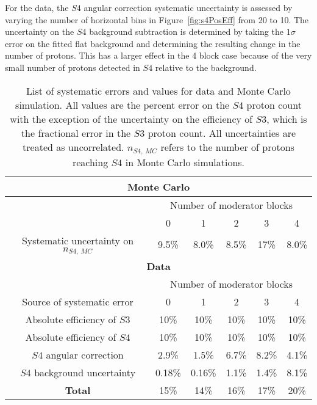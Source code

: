 For the data, the $\mathit{S4}$ angular correction systematic uncertainty is assessed by varying the number of horizontal bins in Figure~\ref{fig:s4PosEff} from 20 to 10.
The uncertainty on the $\mathit{S4}$ background subtraction is determined by taking the $1\sigma$ error on the fitted flat background and determining the resulting change in the number of protons.
This has a larger effect in the 4 block case because of the very small number of protons detected in $\mathit{S4}$ relative to the background.

\begin{table}
	\centering
	\caption{List of systematic errors and values for data and Monte Carlo simulation. All values are the percent error on the $\mathit{S4}$ proton count with the exception of the uncertainty on the efficiency of $\mathit{S3}$, which is the fractional error in the $\mathit{S3}$ proton count. All uncertainties are treated as uncorrelated. $n_{\mathit{S4},~MC}$ refers to the number of protons reaching $\mathit{S4}$ in Monte Carlo simulations.}
	\begin{tabular}{|c|c c c c c|}
		\hline 
		\multicolumn{6}{|c|}{\textbf{Monte Carlo}} \\
		\hline
		& \multicolumn{5}{c|}{Number of moderator blocks} \\
		& 0 & 1 & 2 & 3 & 4 \\
		\hline
		Systematic uncertainty on $n_{\mathit{S4},~MC}$ & 9.5\% & 8.0\% & 8.5\% & 17\% & 8.0\% \\
		\hline
		\hline
		\multicolumn{6}{|c|}{\textbf{Data}} \\
		\hline
		& \multicolumn{5}{c|}{Number of moderator blocks} \\
		Source of systematic error & 0 & 1 & 2 & 3 & 4 \\
		\hline
		Absolute efficiency of $\mathit{S3}$ & 10\% & 10\% & 10\% & 10\% & 10\% \\
		Absolute efficiency of $\mathit{S4}$ & 10\% & 10\% & 10\% & 10\% & 10\% \\ 
		$\mathit{S4}$ angular correction & 2.9\% & 1.5\% & 6.7\% & 8.2\% & 4.1\% \\
		$\mathit{S4}$ background uncertainty & 0.18\% & 0.16\% & 1.1\% & 1.4\% & 8.1\% \\
		\hline
		\textbf{Total} & 15\% & 14\% & 16\% & 17\% & 20\% \\
		\hline 
	\end{tabular}
	\label{tab:systematics}
\end{table}


